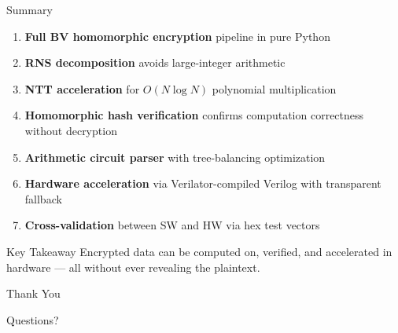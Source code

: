 \documentclass[aspectratio=169, 11pt]{beamer}
\begin{document}
\begin{frame}{Summary}
\begin{enumerate}
    \item \textbf{Full BV homomorphic encryption} pipeline in pure Python
    \item \textbf{RNS decomposition} avoids large-integer arithmetic
    \item \textbf{NTT acceleration} for $O(N \log N)$ polynomial multiplication
    \item \textbf{Homomorphic hash verification} confirms computation correctness without decryption
    \item \textbf{Arithmetic circuit parser} with tree-balancing optimization
    \item \textbf{Hardware acceleration} via Verilator-compiled Verilog with transparent fallback
    \item \textbf{Cross-validation} between SW and HW via hex test vectors
\end{enumerate}

\vspace{0.5em}
\begin{block}{Key Takeaway}
Encrypted data can be computed on, verified, and accelerated in hardware ---
all without ever revealing the plaintext.
\end{block}
\end{frame}

\begin{frame}
\centering
\vspace{2cm}
{\Huge Thank You}
\vspace{1cm}

{\large Questions?}
\end{frame}
\end{document}
